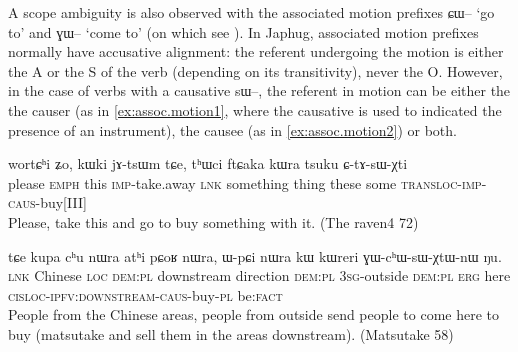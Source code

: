 \documentclass[oldfontcommands,oneside,a4paper,11pt]{article}
\newcommand{\ipa}[1]{{\phon \mbox{#1}}} %
\begin{document}
A scope ambiguity is also observed with the associated motion prefixes \ipa{ɕɯ--} `go to' and  \ipa{ɣɯ--} `come to' (on which see \citealt{jacques13harmonization}). In Japhug, associated motion prefixes normally have accusative alignment: the referent undergoing the motion is either the A or the S of the verb (depending on its transitivity), never the O. However, in the case of verbs with a causative \ipa{sɯ--}, the referent in motion can be either the  the causer (as in \ref{ex:assoc.motion1}, where the causative is used to indicated the presence of an instrument), the causee (as in \ref{ex:assoc.motion2}) or both.


  \begin{exe}
\ex \label{ex:assoc.motion1}
\gll
\ipa{wortɕʰi} 	\ipa{ʑo,} 	\ipa{kɯki} 	\ipa{jɤ-tsɯm} 	\ipa{tɕe,} 	\ipa{tʰɯci} 	\ipa{ftɕaka} 	\ipa{kɯra} 	\ipa{tsuku} 	\ipa{ɕ-tɤ-sɯ-χti} \\
please \textsc{emph} this \textsc{imp}-take.away \textsc{lnk} something thing these some \textsc{transloc-imp-caus}-buy[III] \\
\glt Please, take this and go to buy something with it. (The raven4 72)
  \end{exe} 


  \begin{exe}
\ex \label{ex:assoc.motion2}
\gll
\ipa{tɕe} 	\ipa{kupa} 	\ipa{cʰu} 	\ipa{nɯra} 	\ipa{atʰi} 	\ipa{pɕoʁ} 	\ipa{nɯra,} 	\ipa{ɯ-pɕi} 	\ipa{nɯra} 	\ipa{kɯ} 	\ipa{kɯreri} 	\ipa{ɣɯ-cʰɯ-sɯ-χtɯ-nɯ} 	\ipa{ŋu.}  \\
\textsc{lnk} Chinese \textsc{loc} \textsc{dem:pl} downstream direction \textsc{dem:pl} \textsc{3sg}-outside  \textsc{dem:pl}  \textsc{erg} here \textsc{cisloc-ipfv:downstream-caus}-buy-\textsc{pl} be\textsc{:fact} \\
\glt People from the Chinese areas, people from outside send people to come here to buy (matsutake and sell them in the areas downstream). (Matsutake 58)
  \end{exe} 
\end{document}
